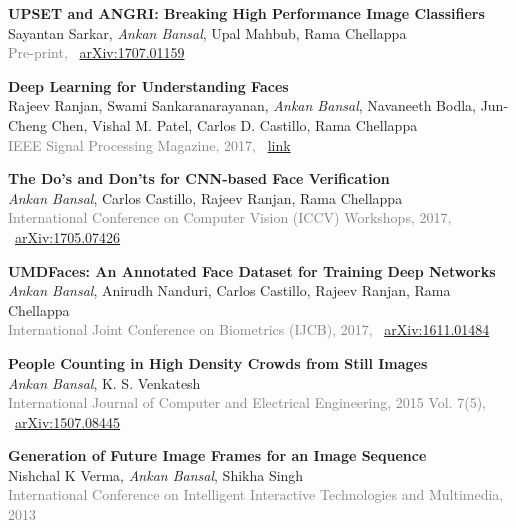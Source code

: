 \documentclass[11pt, a4paper]{article}
\begin{document}
\vspace{4pt}

\textbf{UPSET and ANGRI: Breaking High Performance Image Classifiers} \\
Sayantan Sarkar, \textit{Ankan Bansal}, Upal Mahbub, Rama Chellappa\\
\textcolor{gray}{Pre-print,} ~\href{https://arxiv.org/abs/1707.01159}{arXiv:1707.01159}

\vspace{4pt}

\textbf{Deep Learning for Understanding Faces} \\
Rajeev Ranjan, Swami Sankaranarayanan, \textit{Ankan Bansal}, Navaneeth Bodla, Jun-Cheng Chen, Vishal
M. Patel,  Carlos D. Castillo, Rama Chellappa\\
\textcolor{gray}{IEEE Signal Processing Magazine, 2017,} ~\href{https://ieeexplore.ieee.org/abstract/document/8253595}{link}

\vspace{4pt}

\textbf{The Do's and Don'ts for CNN-based Face Verification} \\
\textit{Ankan Bansal}, Carlos Castillo, Rajeev Ranjan, Rama Chellappa\\
\textcolor{gray}{International Conference on Computer Vision (ICCV) Workshops, 2017,} ~\href{https://arxiv.org/abs/1705.07426}{arXiv:1705.07426}

\vspace{4pt}

\textbf{UMDFaces: An Annotated Face Dataset for Training Deep Networks} \\
\textit{Ankan Bansal}, Anirudh Nanduri, Carlos Castillo, Rajeev Ranjan, Rama Chellappa\\
\textcolor{gray}{International Joint Conference on Biometrics (IJCB), 2017,} ~\href{https://arxiv.org/abs/1611.01484}{arXiv:1611.01484}

\vspace{4pt}

\textbf{People Counting in High Density Crowds from Still Images} \\
\textit{Ankan Bansal}, K. S. Venkatesh\\
\textcolor{gray}{International Journal of Computer and Electrical Engineering, 2015 Vol. 7(5),} ~\href{https://arxiv.org/abs/1507.08445}{arXiv:1507.08445}

\vspace{4pt}

\textbf{Generation of Future Image Frames for an Image Sequence} \\
Nishchal K Verma, \textit{Ankan Bansal}, Shikha Singh\\
\textcolor{gray}{International Conference on Intelligent Interactive Technologies and Multimedia, 2013}
\end{document}
